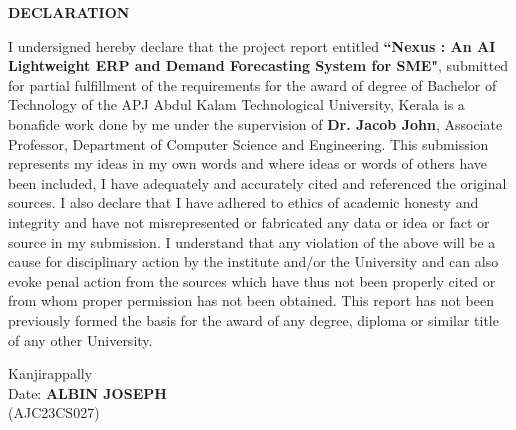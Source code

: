 \begin{titlepage}
\begin{center} 
\textbf {\Large{DECLARATION}} 
\end{center}
\vspace{10pt}
I undersigned hereby declare that the project report entitled \textbf{``Nexus : An AI Lightweight ERP and Demand Forecasting System for SME"}, submitted for partial fulfillment of the requirements for the award of degree of Bachelor of Technology of the APJ Abdul Kalam Technological University, Kerala is a bonafide work done by me under the supervision of \textbf{Dr. Jacob John}, Associate Professor, Department of Computer Science and Engineering. This submission represents my ideas in my own words and where ideas or words of others have been included, I have adequately and accurately cited and referenced the original sources. I also declare that I have adhered to ethics of academic honesty and integrity and have not misrepresented or fabricated any data or idea or fact or source in my submission. I understand that any violation of the above will be a cause for disciplinary action by the institute and/or the University and can also evoke penal action from the sources which have thus not been properly cited or from whom proper permission has not been obtained. This report has not been previously formed the basis for the award of any degree, diploma or similar title of any other University.

\vspace{2.5cm}
\noindent Kanjirappally \\
Date: \hfill \textbf{ALBIN JOSEPH} \\
\hspace*{\fill} (AJC23CS027)
\end{titlepage}